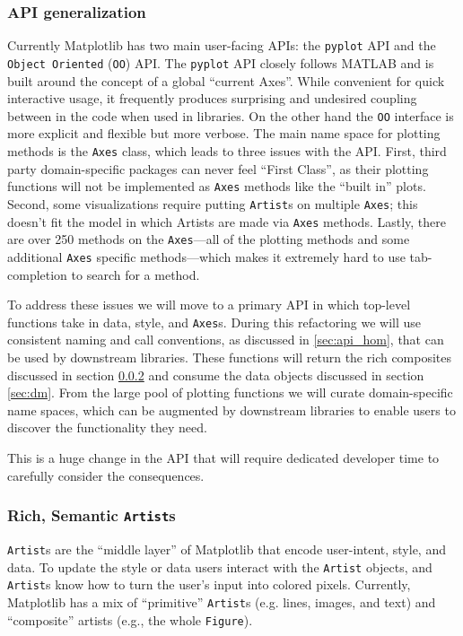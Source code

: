 \documentclass[11pt]{article}  %
\begin{document}
\subsubsection{API generalization}
\label{sec:api_gen}
Currently Matplotlib has two main user-facing APIs: the
\texttt{pyplot} API and the \texttt{Object Oriented} (\texttt{OO})
API.  The \texttt{pyplot} API closely follows MATLAB and is built
around the concept of a global ``current Axes''.  While convenient for
quick interactive usage, it frequently produces surprising and
undesired coupling between in the code when used in libraries.  On the
other hand the \texttt{OO} interface is more explicit and flexible but
more verbose.  The main name space for plotting methods is
the \texttt{Axes} class, which leads to three issues with the API.
First, third party domain-specific packages can never feel ``First
Class'', as their plotting functions will not be implemented as \texttt{Axes} methods like
the ``built in'' plots.  Second, some visualizations require putting
\texttt{Artist}s on multiple \texttt{Axes}; this doesn't fit the model
in which Artists are made via \texttt{Axes} methods.  Lastly, there are over 250
methods on the \texttt{Axes}---all of the plotting methods and some
additional \texttt{Axes} specific methods---which makes it extremely
hard to use tab-completion to search for a method.

To address these issues we will move to a primary API in which top-level
functions take
in data, style, and \texttt{Axes}s.  During this
refactoring we will use consistent naming and call conventions, as
discussed in \ref{sec:api_hom}, that can be used by downstream
libraries.  These functions will return the rich composites discussed
in section \ref{sec:artists} and consume the data objects discussed in
section \ref{sec:dm}.  From the large pool of plotting functions we
will curate domain-specific name spaces, which can be augmented by
downstream libraries to enable users to discover the functionality
they need.

This is a huge change in the API that will require dedicated developer
time to carefully
consider the consequences.


\subsubsection{Rich, Semantic \texttt{Artist}s}
\label{sec:artists}
\texttt{Artist}s are the ``middle layer'' of Matplotlib that encode
user-intent, style, and data.
To update the style or data users interact with the \texttt{Artist}
objects, and \texttt{Artist}s know how to turn the user's input into
colored pixels.
Currently, Matplotlib has a mix of ``primitive'' \texttt{Artist}s
(e.g. lines, images, and text) and ``composite'' artists (e.g.,
the whole \texttt{Figure}).
\end{document}

